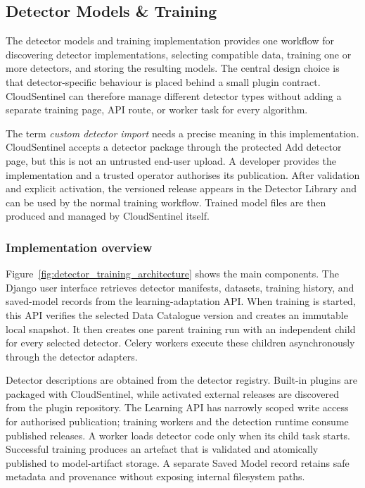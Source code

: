 \subsection{Detector Models \& Training}

The detector models and training implementation provides one workflow for discovering detector implementations, selecting compatible data, training one or more detectors, and storing the resulting models. The central design choice is that detector-specific behaviour is placed behind a small plugin contract. CloudSentinel can therefore manage different detector types without adding a separate training page, API route, or worker task for every algorithm.

The term \emph{custom detector import} needs a precise meaning in this implementation. CloudSentinel accepts a detector package through the protected Add detector page, but this is not an untrusted end-user upload. A developer provides the implementation and a trusted operator authorises its publication. After validation and explicit activation, the versioned release appears in the Detector Library and can be used by the normal training workflow. Trained model files are then produced and managed by CloudSentinel itself.

\subsubsection{Implementation overview}

Figure~\ref{fig:detector_training_architecture} shows the main components. The Django user interface retrieves detector manifests, datasets, training history, and saved-model records from the learning-adaptation API. When training is started, this API verifies the selected Data Catalogue version and creates an immutable local snapshot. It then creates one parent training run with an independent child for every selected detector. Celery workers execute these children asynchronously through the detector adapters.

Detector descriptions are obtained from the detector registry. Built-in plugins are packaged with CloudSentinel, while activated external releases are discovered from the plugin repository. The Learning API has narrowly scoped write access for authorised publication; training workers and the detection runtime consume published releases. A worker loads detector code only when its child task starts. Successful training produces an artefact that is validated and atomically published to model-artifact storage. A separate Saved Model record retains safe metadata and provenance without exposing internal filesystem paths.

